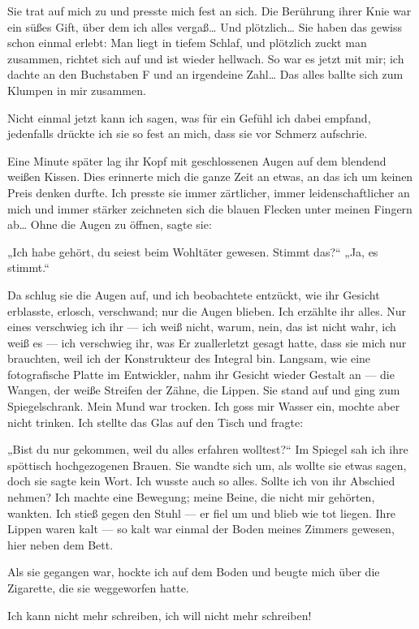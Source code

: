Sie trat auf mich zu und presste mich fest an sich. Die Berührung
ihrer Knie war ein süßes Gift, über dem ich alles vergaß\ldots{} Und
plötzlich\ldots{} Sie haben das gewiss schon einmal erlebt: Man liegt in
tiefem Schlaf, und plötzlich zuckt man zusammen, richtet sich auf
und ist wieder hellwach. So war es jetzt mit mir; ich dachte an den
Buchstaben F und an irgendeine Zahl\ldots{} Das alles ballte sich zum
Klumpen in mir zusammen.

Nicht einmal jetzt kann ich sagen, was für ein Gefühl ich dabei
empfand, jedenfalls drückte ich sie so fest an mich, dass sie vor
Schmerz aufschrie.

Eine Minute später lag ihr Kopf mit geschlossenen Augen auf dem
blendend weißen Kissen. Dies erinnerte mich die ganze Zeit an
etwas, an das ich um keinen Preis denken durfte. Ich presste sie
immer zärtlicher, immer leidenschaftlicher an mich und immer
stärker zeichneten sich die blauen Flecken unter meinen Fingern
ab\ldots{} Ohne die Augen zu öffnen, sagte sie:

„Ich habe gehört, du seiest beim Wohltäter gewesen. Stimmt das?“
„Ja, es stimmt.“

Da schlug sie die Augen auf, und ich beobachtete entzückt, wie ihr
Gesicht erblasste, erlosch, verschwand; nur die Augen blieben. Ich
erzählte ihr alles. Nur eines verschwieg ich ihr — ich weiß nicht,
warum, nein, das ist nicht wahr, ich weiß es — ich verschwieg ihr,
was Er zuallerletzt gesagt hatte, dass sie mich nur brauchten, weil
ich der Konstrukteur des Integral bin. Langsam, wie eine
fotografische Platte im Entwickler, nahm ihr Gesicht wieder Gestalt
an — die Wangen, der weiße Streifen der Zähne, die Lippen. Sie
stand auf und ging zum Spiegelschrank. Mein Mund war trocken. Ich
goss mir Wasser ein, mochte aber nicht trinken. Ich stellte das
Glas auf den Tisch und fragte:

„Bist du nur gekommen, weil du alles erfahren wolltest?“ Im Spiegel
sah ich ihre spöttisch hochgezogenen Brauen. Sie wandte sich um,
als wollte sie etwas sagen, doch sie sagte kein Wort. Ich wusste
auch so alles. Sollte ich von ihr Abschied nehmen? Ich machte eine
Bewegung; meine Beine, die nicht mir gehörten, wankten. Ich stieß
gegen den Stuhl — er fiel um und blieb wie tot liegen. Ihre Lippen
waren kalt — so kalt war einmal der Boden meines Zimmers gewesen,
hier neben dem Bett.

Als sie gegangen war, hockte ich auf dem Boden und beugte mich über
die Zigarette, die sie weggeworfen
hatte.

Ich kann nicht mehr schreiben, ich will nicht mehr schreiben!

